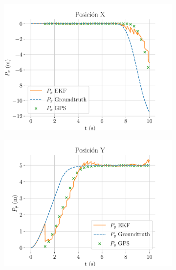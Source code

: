 \begin{figure}[b]	
	\centering
	\hspace*{-0.5cm}
	\begin{subfigure}[t]{0.49\textwidth}
		\centering
		\includegraphics[width=\textwidth]{estimador_px4/im_simu/no_handle_delay/x_t}
		\caption{}
	\end{subfigure}
	\quad
	\begin{subfigure}[t]{0.49\textwidth}
		\centering
		\includegraphics[width=\textwidth]{estimador_px4/im_simu/no_handle_delay/y_t}
		\caption{}
	\end{subfigure}
	\quad
	\hspace*{-0.5cm}
	\begin{subfigure}[t]{0.49\textwidth}

\end{subfigure}
\end{figure}
